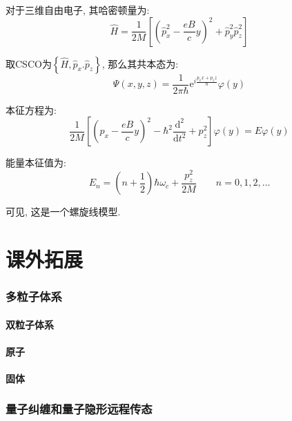 \documentclass[a4paper, 11pt]{article}
\begin{document}
\begin{spacing}{1.2}
       对于三维自由电子, 其哈密顿量为:
       \begin{equation}
        \hat{H} = \dfrac{1}{2M}\left[\left(\hat{p}_x^2-\dfrac{eB}{c}y\right)^2+\hat{p}_y^2\hat{p}_z^2\right]
       \end{equation}
        
       取CSCO为$\left\{\hat{H}, \hat{p}_x. \hat{p}_z\right\}$, 那么其共本态为:
       \begin{equation}
         \Psi(x,y,z) = \dfrac{1}{2\pi\hbar}\mathrm{e}^{i\frac{p_xx+p_zz}{\hbar}}\varphi(y)
       \end{equation}

       本征方程为:
       \begin{equation}
         \dfrac{1}{2M}\left[\left(p_x-\dfrac{eB}{c}y\right)^2-\hbar^2%
         \dfrac{\mathrm{d}^2}{\mathrm{d}t^2}+p_z^2\right]\varphi(y)=E\varphi(y)
       \end{equation}

       能量本征值为:
       \begin{equation}
         E_n = \left(n+\dfrac{1}{2}\right)\hbar\omega_c+\dfrac{p_z^2}{2M}\qquad{}n=0,1,2,\ldots
       \end{equation}

       可见, 这是一个螺旋线模型.
  \part{课外拓展}
    \section{多粒子体系}
      \subsection{双粒子体系}

      \subsection{原子}

      \subsection{固体}


    \section{量子纠缠和量子隐形远程传态} 
      
\end{spacing}
\end{document}
